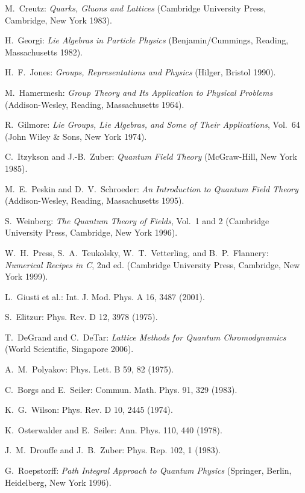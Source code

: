 \begin{enumerate}[label={[\arabic*]}]
  \item M.~Creutz: \emph{Quarks, Gluons and Lattices} (Cambridge University
        Press, Cambridge, New York 1983).
  \item H.~Georgi: \emph{Lie Algebras in Particle Physics}
        (Benjamin/Cummings, Reading, Massachusetts 1982).
  \item H.~F.~Jones: \emph{Groups, Representations and Physics} (Hilger,
        Bristol 1990).
  \item M.~Hamermesh: \emph{Group Theory and Its Application to Physical
        Problems} (Addison-Wesley, Reading, Massachusetts 1964).
  \item R.~Gilmore: \emph{Lie Groups, Lie Algebras, and Some of Their
        Applications}, Vol.~64 (John Wiley \& Sons, New York 1974).
  \item C.~Itzykson and J.-B.~Zuber: \emph{Quantum Field Theory} (McGraw-Hill,
        New York 1985).
  \item M.~E.~Peskin and D.~V.~Schroeder: \emph{An Introduction to Quantum
        Field Theory} (Addison-Wesley, Reading, Massachusetts 1995).
  \item S.~Weinberg: \emph{The Quantum Theory of Fields}, Vol.~1 and 2
        (Cambridge University Press, Cambridge, New York 1996).
  \item W.~H.~Press, S.~A.~Teukolsky, W.~T.~Vetterling, and B.~P.~Flannery:
        \emph{Numerical Recipes in C}, 2nd ed. (Cambridge University Press,
        Cambridge, New York 1999).
  \item L.~Giusti et al.: Int. J. Mod. Phys. A 16, 3487 (2001).
  \item S.~Elitzur: Phys. Rev. D 12, 3978 (1975).
  \item T.~DeGrand and C.~DeTar: \emph{Lattice Methods for Quantum
        Chromodynamics} (World Scientific, Singapore 2006).
  \item A.~M.~Polyakov: Phys. Lett. B 59, 82 (1975).
  \item C.~Borgs and E.~Seiler: Commun. Math. Phys. 91, 329 (1983).
  \item K.~G.~Wilson: Phys. Rev. D 10, 2445 (1974).
  \item K.~Osterwalder and E.~Seiler: Ann. Phys. 110, 440 (1978).
  \item J.~M.~Drouffe and J.~B.~Zuber: Phys. Rep. 102, 1 (1983).
  \item G.~Roepstorff: \emph{Path Integral Approach to Quantum Physics}
        (Springer, Berlin, Heidelberg, New York 1996).

\end{enumerate}
